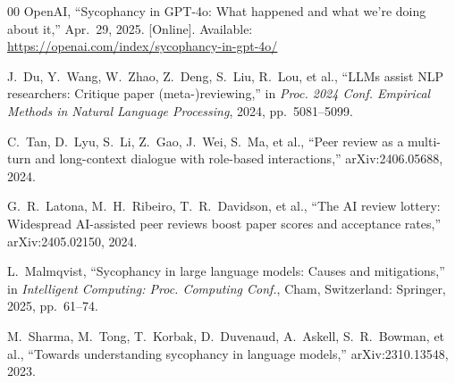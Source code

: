 \documentclass[preprint,10pt,times]{elsarticle}
\begin{document}
\begin{thebibliography}{00}
OpenAI,
``Sycophancy in GPT-4o: What happened and what we're doing about it,'' Apr.~29, 2025. [Online]. Available: \url{https://openai.com/index/sycophancy-in-gpt-4o/}

J.~Du, Y.~Wang, W.~Zhao, Z.~Deng, S.~Liu, R.~Lou, et al.,
``LLMs assist NLP researchers: Critique paper (meta-)reviewing,''
in \textit{Proc. 2024 Conf. Empirical Methods in Natural Language Processing}, 2024, pp.~5081--5099.

C.~Tan, D.~Lyu, S.~Li, Z.~Gao, J.~Wei, S.~Ma, et al.,
``Peer review as a multi-turn and long-context dialogue with role-based interactions,''
arXiv:2406.05688, 2024.

G.~R.~Latona, M.~H.~Ribeiro, T.~R.~Davidson, et al.,
``The AI review lottery: Widespread AI-assisted peer reviews boost paper scores and acceptance rates,''
arXiv:2405.02150, 2024.

L.~Malmqvist,
``Sycophancy in large language models: Causes and mitigations,''
in \textit{Intelligent Computing: Proc. Computing Conf.}, Cham, Switzerland: Springer, 2025, pp.~61--74.

M.~Sharma, M.~Tong, T.~Korbak, D.~Duvenaud, A.~Askell, S.~R.~Bowman, et al.,
``Towards understanding sycophancy in language models,''
arXiv:2310.13548, 2023.

\end{thebibliography}
\end{document}
